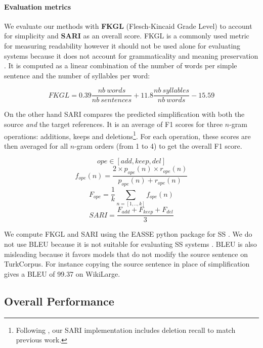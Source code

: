 \documentclass[10pt, a4paper]{article}
\begin{document}
\paragraph{Evaluation metrics}
We evaluate our methods with \textbf{FKGL} (Flesch-Kincaid Grade Level)  \cite{kincaid1975derivation} to account for simplicity and \textbf{SARI} \cite{xu2016optimizing} as an overall score.
FKGL is a commonly used metric for measuring readability however it should not be used alone for evaluating systems because it does not account for grammaticality and meaning preservation \cite{wubben2012sentence}. It is computed as a linear combination of the number of words per simple sentence and the number of syllables per word:

\[FKGL = 0.39\frac{nb\ words}{nb\ sentences} + 11.8\frac{nb\ syllables}{nb\ words} - 15.59\]

On the other hand SARI compares the predicted simplification with both the source \textit{and} the target references. It is an average of F1 scores for three $n$-gram operations: additions, keeps and deletions\footnote{Following , our SARI implementation includes deletion recall to match previous work.}. For each operation, these scores are then averaged for all $n$-gram orders (from 1 to 4) to get the overall F1 score.

    \[ope \in [add, keep, del]\]
    \[f_{ope}(n) = \frac{2 \times p_{ope}(n) \times r_{ope}(n)}{p_{ope}(n)+r_{ope}(n)}\]
    \[F_{ope} = \frac{1}{k}\sum_{n=[1,..,k]}f_{ope}(n)\]
    \[SARI = \frac{F_{add} + F_{keep} + F_{del}}{3}\]

We compute FKGL and SARI using the EASSE python package for SS \cite{alva2019easse}.
We do not use BLEU because it is not suitable for evaluating SS systems \cite{sulem2018bleu}.
BLEU is also misleading because it favors models that do not modify the source sentence \cite{xu2016optimizing} on TurkCorpus. For instance copying the source sentence in place of simplification gives a BLEU of 99.37 on WikiLarge.



\subsection{Overall Performance}
\end{document}
